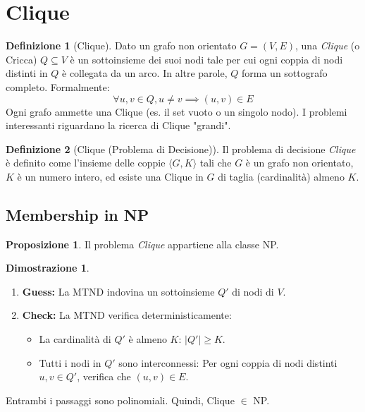 \documentclass[a4paper]{article}
\theoremstyle{definition} %
\newtheorem{definition}{Definizione}[section]
\newtheorem{proposition}{Proposizione}[section]
\theoremstyle{definition} %
\newtheorem*{proof*}{Dimostrazione}
\begin{document}
\section{Clique}

\begin{definition}[Clique]
Dato un grafo non orientato $G=(V, E)$, una \emph{Clique} (o Cricca) $Q \subseteq V$ è un sottoinsieme dei suoi nodi tale per cui ogni coppia di nodi distinti in $Q$ è collegata da un arco. In altre parole, $Q$ forma un sottografo completo. Formalmente:
\[ \forall u, v \in Q, u \ne v \implies (u, v) \in E \]
Ogni grafo ammette una Clique (es. il set vuoto o un singolo nodo). I problemi interessanti riguardano la ricerca di Clique "grandi".
\end{definition}

\begin{definition}[Clique (Problema di Decisione)]
Il problema di decisione \emph{Clique} è definito come l'insieme delle coppie $\langle G, K \rangle$ tali che $G$ è un grafo non orientato, $K$ è un numero intero, ed esiste una Clique in $G$ di taglia (cardinalità) almeno $K$.
\end{definition}

\subsection{Membership in NP}

\begin{proposition}
Il problema \emph{Clique} appartiene alla classe NP.
\end{proposition}

\begin{proof*}
\begin{enumerate}
    \item \textbf{Guess:} La MTND indovina un sottoinsieme $Q'$ di nodi di $V$.
    \item \textbf{Check:} La MTND verifica deterministicamente:
    \begin{itemize}
        \item La cardinalità di $Q'$ è almeno $K$: $|Q'| \ge K$.
        \item Tutti i nodi in $Q'$ sono interconnessi: Per ogni coppia di nodi distinti $u, v \in Q'$, verifica che $(u, v) \in E$.
    \end{itemize}
\end{enumerate}
Entrambi i passaggi sono polinomiali. Quindi, Clique $\in$ NP.
\end{proof*}
\end{document}
